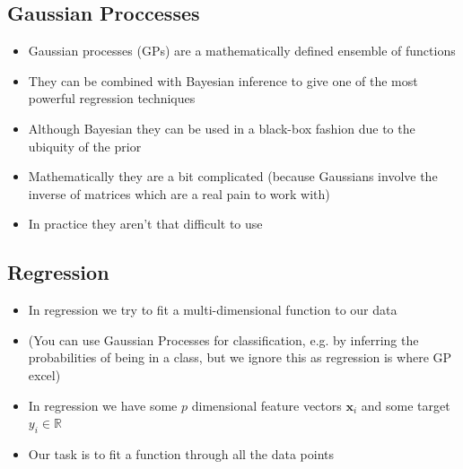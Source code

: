 \begin{slide}
\section{Gaussian Proccesses}

\begin{PauseHighLight}
  \begin{itemize}
  \item Gaussian processes (GPs) are a mathematically defined ensemble
    of functions\pause
  \item They can be combined with Bayesian inference to give one of the
    most powerful regression techniques\pause
  \item Although Bayesian they can be used in a black-box fashion
    due to the ubiquity of the prior\pause
  \item Mathematically they are a bit complicated\pause{} (because
    Gaussians involve the inverse of matrices which are a real pain to
    work with)\pauseb
  \item In practice they aren't that difficult to use\pause
  \end{itemize}
\end{PauseHighLight}

\end{slide}


\begin{slide}
\section{Regression}

\begin{PauseHighLight}
  \begin{itemize}
  \item In regression we try to fit a multi-dimensional function to our
    data\pause
  \item (You can use Gaussian Processes for classification, e.g. by
    inferring the probabilities of being in a class, but we ignore this
    as regression is where GP excel)\pause
  \item In regression we have some $p$ dimensional feature vectors
    $\bm{x}_i$ and some target $y_i \in \mathbb{R}$\pause
  \item Our task is to fit a function through all the data points\pause
  \end{itemize}
\end{PauseHighLight}

\end{slide}

